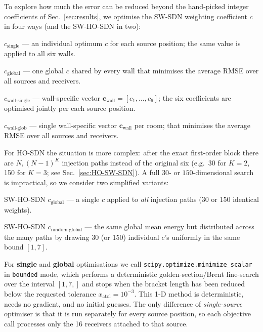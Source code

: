 \documentclass[journal]{IEEEtran}
\begin{document}
To explore how much the error can be reduced beyond the 
hand-picked integer coefficients of 
Sec.~\ref{sec:results}, we optimise the SW-SDN weighting coefficient $c$ in four ways (and the SW-HO-SDN in two):

$c_\text{single}$ — an individual optimum $c$ for each source position; the same value is applied to all six walls.

$c_\text{global}$ — one global $c$ shared by every wall 
that minimises the average RMSE over all sources and receivers.

$c_\text{wall-single}$ — wall-specific vector 
$\mathbf{c}_\text{wall}=[c_1,\dots,c_6]$; the six 
coefficients are optimised jointly per each source position.

$c_\text{wall-glob}$ — single wall-specific vector 
$\mathbf{c}_\text{wall}$ per room; that minimises the average RMSE over all sources and receivers.

For HO-SDN the situation is more complex: after the exact first-order block there are
$N,(N-1)^K$ injection paths instead of the original six (e.g.\ 30 for $K=2$, 150 for $K=3$; see Sec.~\ref{sec:HO-SW-SDN}).
A full $30$- or $150$-dimensional search is impractical, so we consider two simplified variants:

SW-HO-SDN $c_\text{global}$ — a single $c$ applied to \emph{all} injection paths (30 or 150 identical weights).

SW-HO-SDN $c_\text{random-global}$ — the same global mean 
energy but distributed across the many paths by drawing 30 (or 150) individual $c$’s uniformly in the same bound $[1,7]$. 


For \textbf{single} and \textbf{global} optimisations we call \texttt{scipy.optimize.minimize\_scalar} in
\texttt{bounded} mode, which performs a deterministic
golden-section/Brent line-search over the interval $[1,7,]$ and stops
when the bracket length has been reduced below the requested tolerance
$x_{\mathrm{atol}}=10^{-3}$. This 1-D method is deterministic, needs no gradient, and no initial guesses.
The only difference of \emph{single-source} optimiser is 
that it is run separately for every source position, so each objective call processes
only the 16 receivers attached to that source.
\end{document}
